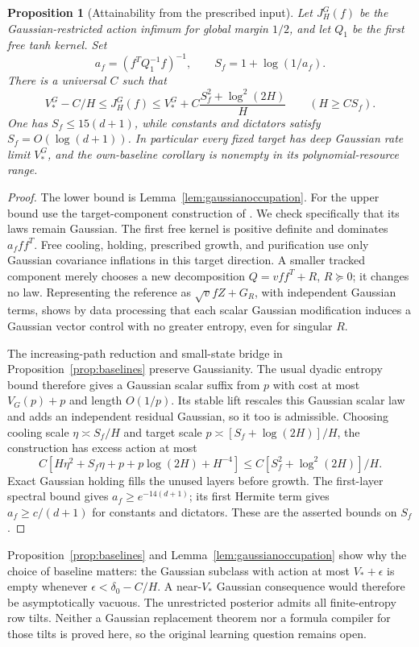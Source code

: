 \documentclass[11pt]{article}
\newtheorem{proposition}[theorem]{Proposition}
\theoremstyle{remark}\newtheorem{remark}[theorem]{Remark}
\begin{document}
\begin{proposition}[Attainability from the prescribed input]
\label{prop:attainability}
Let $J_H^G(f)$ be the Gaussian-restricted action infimum for global
margin $1/2$, and let $Q_1$ be the first free tanh kernel. Set
\[
 a_f=(f^TQ_1^{-1}f)^{-1},\qquad S_f=1+\log(1/a_f).
\]
There is a universal $C$ such that
\[
 V_*^G-C/H\le J_H^G(f)
 \le V_*^G+C\frac{S_f^2+\log^2(2H)}H\qquad(H\ge CS_f).
\]
One has $S_f\le15(d+1)$, while constants and dictators satisfy
$S_f=O(\log(d+1))$. In particular every fixed target has deep Gaussian
rate limit $V_*^G$, and the own-baseline corollary is nonempty in its
polynomial-resource range.
\end{proposition}
\begin{proof}
The lower bound is Lemma~\ref{lem:gaussianoccupation}. For the upper
bound use the target-component construction of \cite{critical}.
We check specifically that its laws remain Gaussian. The first free
kernel is positive definite and dominates $a_fff^T$. Free cooling,
holding, prescribed growth, and purification use only Gaussian
covariance inflations in this target direction. A smaller tracked
component merely chooses a new decomposition $Q=vff^T+R$, $R\succeq0$;
it changes no law. Representing the reference as
$\sqrt v fZ+G_R$, with independent Gaussian terms, shows by data
processing that each scalar Gaussian modification induces a Gaussian
vector control with no greater entropy, even for singular $R$.

The increasing-path reduction and small-state bridge in
Proposition~\ref{prop:baselines} preserve Gaussianity. The usual dyadic
entropy bound therefore gives a Gaussian scalar suffix from $p$ with
cost at most $V_G(p)+p$ and length $O(1/p)$. Its stable lift rescales
this Gaussian scalar law and adds an independent residual Gaussian,
so it too is admissible. Choosing cooling scale $\eta\asymp S_f/H$
and target scale $p\asymp[S_f+\log(2H)]/H$, the construction has
excess action at most
\[
 C[H\eta^2+S_f\eta+p+p\log(2H)+H^{-4}]
 \le C[S_f^2+\log^2(2H)]/H.
\]
Exact Gaussian holding fills the unused layers before growth. The
first-layer spectral bound gives $a_f\ge e^{-14(d+1)}$; its first
Hermite term gives $a_f\ge c/(d+1)$ for constants and dictators.
These are the asserted bounds on $S_f$.
\end{proof}

Proposition~\ref{prop:baselines} and Lemma~\ref{lem:gaussianoccupation}
show why the choice of baseline matters: the Gaussian subclass with
action at most $V_*+\epsilon$ is empty whenever
$\epsilon<\delta_0-C/H$. A near-$V_*$ Gaussian consequence would
therefore be asymptotically vacuous. The unrestricted posterior admits
all finite-entropy row tilts. Neither a Gaussian replacement theorem nor
a formula compiler for those tilts is proved here, so the original
learning question remains open.
\end{document}
